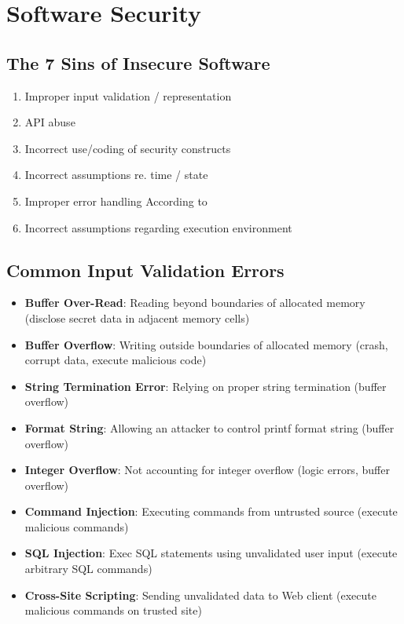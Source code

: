 \section{Software Security}
\subsection{The 7 Sins of Insecure Software}
\begin{enumerate}
    \item Improper input validation / representation
    \item API abuse
    \item Incorrect use/coding of security constructs
    \item Incorrect assumptions re. time / state
    \item Improper error handling According to
    \item Incorrect assumptions regarding execution environment
\end{enumerate}

\subsection{Common Input Validation Errors}
\begin{itemize}
    \item \textbf{Buffer Over-Read}: Reading beyond boundaries of allocated memory (disclose secret data in adjacent memory cells)
    \item \textbf{Buffer Overflow}: Writing outside boundaries of allocated memory (crash, corrupt data, execute malicious code)
    \item \textbf{String Termination Error}: Relying on proper string termination (buffer overflow)
    \item \textbf{Format String}: Allowing an attacker to control printf format string (buffer overflow)
    \item \textbf{Integer Overflow}: Not accounting for integer overflow (logic errors, buffer overflow)
    \item \textbf{Command Injection}: Executing commands from untrusted source (execute malicious commands)
    \item \textbf{SQL Injection}: Exec SQL statements using unvalidated user input (execute arbitrary SQL commands)
    \item \textbf{Cross-Site Scripting}: Sending unvalidated data to Web client (execute malicious commands on trusted site)
\end{itemize}

